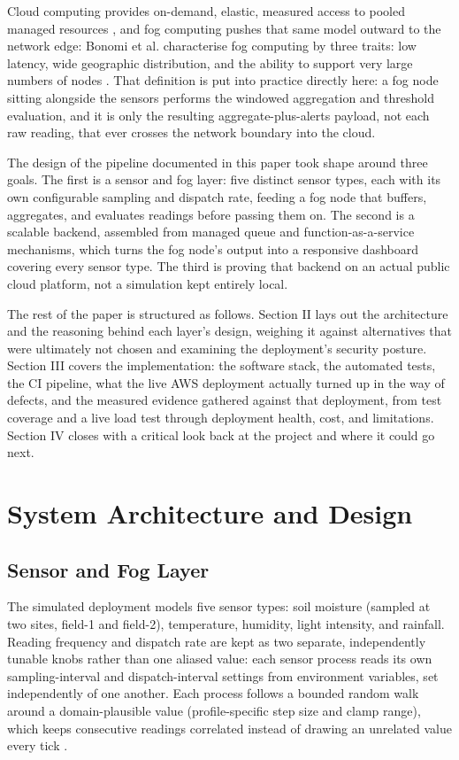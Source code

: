 \documentclass[conference]{IEEEtran}
\begin{document}
Cloud computing provides on-demand, elastic, measured access to pooled managed resources \cite{ref2}, and fog computing pushes that same model outward to the network edge: Bonomi et al. characterise fog computing by three traits: low latency, wide geographic distribution, and the ability to support very large numbers of nodes \cite{ref3}. That definition is put into practice directly here: a fog node sitting alongside the sensors performs the windowed aggregation and threshold evaluation, and it is only the resulting aggregate-plus-alerts payload, not each raw reading, that ever crosses the network boundary into the cloud.

The design of the pipeline documented in this paper took shape around three goals. The first is a sensor and fog layer: five distinct sensor types, each with its own configurable sampling and dispatch rate, feeding a fog node that buffers, aggregates, and evaluates readings before passing them on. The second is a scalable backend, assembled from managed queue and function-as-a-service mechanisms, which turns the fog node's output into a responsive dashboard covering every sensor type. The third is proving that backend on an actual public cloud platform, not a simulation kept entirely local.

The rest of the paper is structured as follows. Section II lays out the architecture and the reasoning behind each layer's design, weighing it against alternatives that were ultimately not chosen and examining the deployment's security posture. Section III covers the implementation: the software stack, the automated tests, the CI pipeline, what the live AWS deployment actually turned up in the way of defects, and the measured evidence gathered against that deployment, from test coverage and a live load test through deployment health, cost, and limitations. Section IV closes with a critical look back at the project and where it could go next.

\section{System Architecture and Design}

\subsection{Sensor and Fog Layer}
The simulated deployment models five sensor types: soil moisture (sampled at two sites, field-1 and field-2), temperature, humidity, light intensity, and rainfall. Reading frequency and dispatch rate are kept as two separate, independently tunable knobs rather than one aliased value: each sensor process reads its own sampling-interval and dispatch-interval settings from environment variables, set independently of one another. Each process follows a bounded random walk around a domain-plausible value (profile-specific step size and clamp range), which keeps consecutive readings correlated instead of drawing an unrelated value every tick \cite{ref4}.
\end{document}
